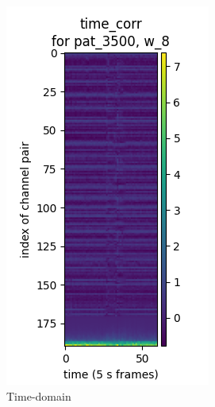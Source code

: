 \begin{figure}[htb]
    \centering
    \begin{subfigure}[t]{0.3\textwidth}
        \includegraphics[width=\textwidth]{c2Deterministic/Figs/PSP/time_corr.png}
        \caption{Time-domain}{}
    \end{subfigure}
    \hfill
    \begin{subfigure}[t]{0.3\textwidth}

\end{subfigure}
\end{figure}
